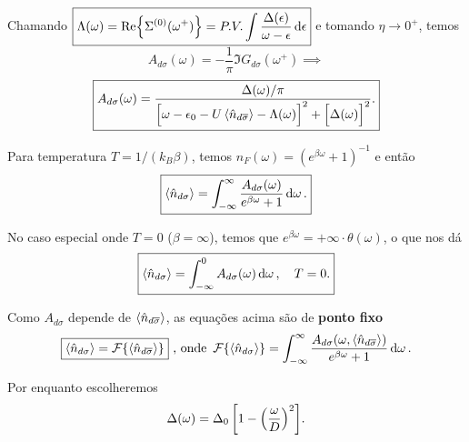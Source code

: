 \documentclass[a4paper,fleqn,12pt]{article}
\begin{document}
Chamando $\boxed{ \Lambda(\omega) = \Re{\Sigma^{(0)}(\omega^+)} = P.V. \int \frac{\Delta(\epsilon)}{\omega - \epsilon} \dd{\epsilon} }$ e tomando $\eta \to 0^+$, temos
$$
A_{d\sigma}(\omega) = - \frac{1}{\pi} \Im{G_{d\sigma}(\omega^+)} \implies
$$
$$
\boxed{ A_{d\sigma}(\omega) = \frac{\Delta(\omega) / \pi}{
\Big[\omega - \eps_0 - U \ev{\nn_{d\cc{\sigma}}} - \Lambda(\omega) \Big]^2
+ \Big[\Delta(\omega)\Big]^2 }. }
$$

Para temperatura $T = 1/(k_B \beta)$, temos $n_F(\omega) = (e^{\beta \omega} + 1)^{-1}$ e então
$$
\boxed{ \ev{\nn_{d\sigma}} = \intR \frac{A_{d\sigma}(\omega)}{e^{\beta\omega} + 1} \dd{\omega}. }
$$

No caso especial onde $T = 0$ ($\beta = \infty$), temos que $e^{\beta \omega} = +\infty \cdot \theta(\omega)$, o que nos dá
$$
\boxed{ \ev{\nn_{d\sigma}} = \int_{-\infty}^0 A_{d\sigma}(\omega) \dd{\omega}, \quad T = 0. }
$$

Como $A_{d\sigma}$ depende de $\ev{\nn_{d\cc{\sigma}}}$, as equações acima são de \textbf{ponto fixo}
$$
\boxed{ \ev{\nn_{d\sigma}} = \s{F}\qty{\ev{\nn_{d\cc{\sigma}}}} } \text{ , onde } \,
\s{F}\qty{\ev{\nn_{d\sigma}}} =
\intR \frac{A_{d\sigma}(\omega, \ev{\nn_{d\cc{\sigma}}})}{e^{\beta\omega} + 1} \dd{\omega}.
$$

Por enquanto escolheremos
$$
\Delta(\omega) = \Delta_0 \, \qty[1 - \qty(\frac{\omega}{D})^2].
$$
\end{document}
